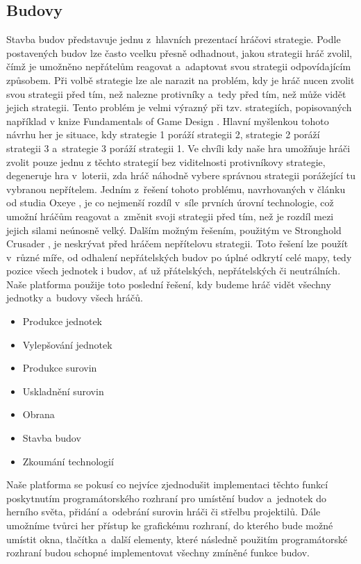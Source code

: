 \subsection{Budovy}
\label{sec:budovy}
Stavba budov představuje jednu z~hlavních prezentací hráčovi strategie. Podle postavených budov lze často vcelku přesně odhadnout, jakou strategii hráč zvolil, čímž je umožněno nepřátelům reagovat a~adaptovat svou strategii odpovídajícím způsobem. 
Při volbě strategie lze ale narazit na problém, kdy je hráč nucen zvolit svou strategii před tím, než nalezne protivníky a~tedy před tím, než může vidět jejich strategii. Tento problém je velmi výrazný při tzv.    strategiích, popisovaných například v knize Fundamentals of Game Design \citep[str.~329]{book:gamefund}. Hlavní myšlenkou tohoto návrhu her je situace, kdy strategie 1 poráží strategii 2, strategie 2 poráží strategii 3 a~strategie 3 poráží strategii 1. Ve chvíli kdy naše hra umožňuje hráči zvolit pouze jednu z těchto strategií bez viditelnosti protivníkovy strategie, degeneruje hra v~loterii, zda hráč náhodně vybere správnou strategii porážející tu vybranou nepřítelem. Jedním z~řešení tohoto problému, navrhovaných v článku od studia Oxeye \citep{site:oxeye03}, je co nejmenší rozdíl v~síle prvních úrovní technologie, což umožní hráčům reagovat a~změnit svoji strategii před tím, než je rozdíl mezi jejich silami neúnosně velký. Dalším možným řešením, použitým ve Stronghold Crusader \citep{site:strongholdcrus}, je neskrývat před hráčem nepřítelovu strategii. Toto řešení lze použít v~různé míře, od odhalení nepřátelských budov po úplné odkrytí celé mapy, tedy pozice všech jednotek i budov, ať už přátelských, nepřátelských či neutrálních. Naše platforma použije toto poslední řešení, kdy budeme hráč vidět všechny jednotky a~budovy všech hráčů.

\begin{itemize}
	\item Produkce jednotek
	\item Vylepšování jednotek
	\item Produkce surovin
	\item Uskladnění surovin
	\item Obrana
	\item Stavba budov
	\item Zkoumání technologií
\end{itemize}


Naše platforma se pokusí co nejvíce zjednodušit implementaci těchto funkcí poskytnutím programátorského rozhraní pro umístění budov a~jednotek do herního světa, přidání a~odebrání surovin hráči či střelbu projektilů. Dále umožníme tvůrci her přístup ke grafickému rozhraní, do kterého bude možné umístit okna, tlačítka a~další elementy, které následně použitím programátorské rozhraní budou schopné implementovat všechny zmíněné funkce budov.  

